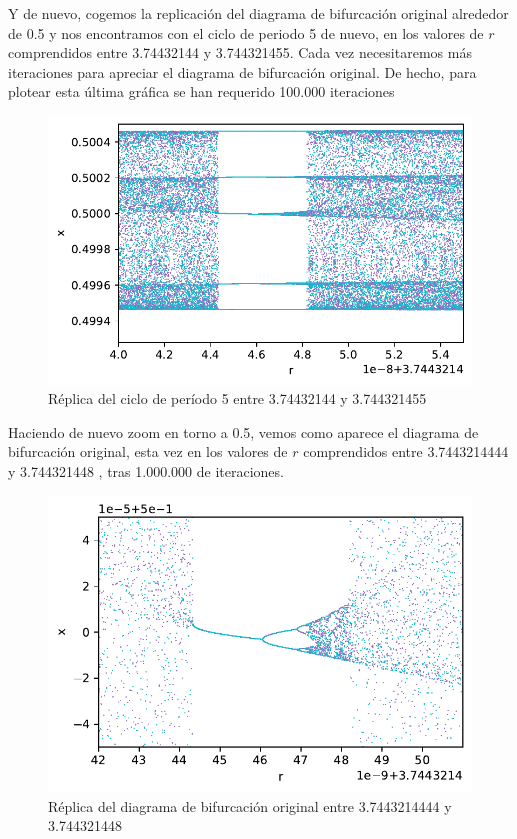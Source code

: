 \documentclass[
  10pt,
  a4paper,
  DIV=11,
  numbers=noendperiod,
  open=any]{scrreprt}
\numberwithin{equation}{chapter}
\numberwithin{equation}{section}
\renewcommand{\[}{\begin{equation}}
\renewcommand{\]}{\end{equation}}
\begin{document}
Y de nuevo, cogemos la replicación del diagrama de bifurcación original
alrededor de 0.5 y nos encontramos con el ciclo de periodo 5 de nuevo,
en los valores de \(r\) comprendidos entre 3.74432144 y 3.744321455.
Cada vez necesitaremos más iteraciones para apreciar el diagrama de
bifurcación original. De hecho, para plotear esta última gráfica se han
requerido 100.000 iteraciones


\begin{figure}[h]
  \centering
  \includegraphics[keepaspectratio]{01-logistica/Caos_files/figure-pdf/cell-9-output-1.pdf}
  \caption{Réplica del ciclo de período 5 entre 3.74432144 y 3.744321455}
\end{figure}


Haciendo de nuevo zoom en torno a 0.5, vemos como aparece el diagrama de
bifurcación original, esta vez en los valores de \(r\) comprendidos
entre 3.7443214444 y 3.744321448 , tras 1.000.000 de iteraciones.


\begin{figure}[h]
  \centering
  \includegraphics[keepaspectratio]{01-logistica/Caos_files/figure-pdf/cell-10-output-1.pdf}
  \caption{Réplica del diagrama de bifurcación original entre 3.7443214444 y 3.744321448 }
\end{figure}
\end{document}
